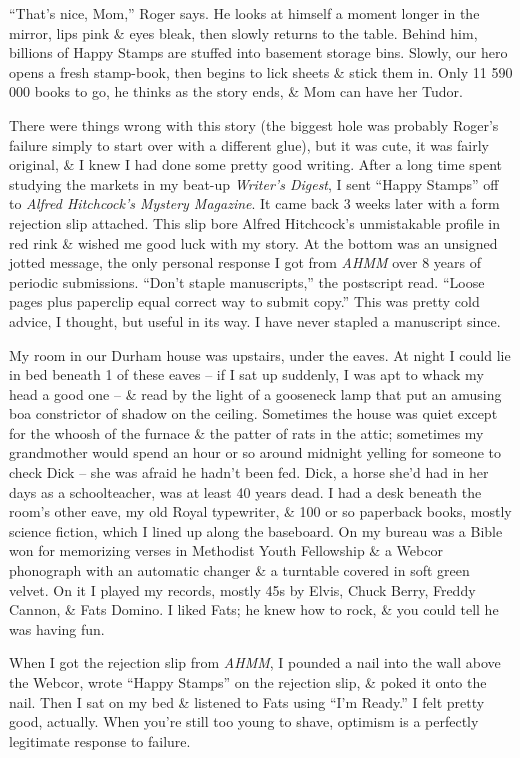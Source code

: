 \documentclass{article}
\numberwithin{equation}{section}
\begin{document}
``That's nice, Mom,'' Roger says. He looks at himself a moment longer in the mirror, lips pink \& eyes bleak, then slowly returns to the table. Behind him, billions of Happy Stamps are stuffed into basement storage bins. Slowly, our hero opens a fresh stamp-book, then begins to lick sheets \& stick them in. Only 11 590 000 books to go, he thinks as the story ends, \& Mom can have her Tudor.

There were things wrong with this story (the biggest hole was probably Roger's failure simply to start over with a different glue), but it was cute, it was fairly original, \& I knew I had done some pretty good writing. After a long time spent studying the markets in my beat-up \textit{Writer's Digest}, I sent ``Happy Stamps'' off to \textit{Alfred Hitchcock's Mystery Magazine}. It came back 3 weeks later with a form rejection slip attached. This slip bore Alfred Hitchcock's unmistakable profile in red rink \& wished me good luck with my story. At the bottom was an unsigned jotted message, the only personal response I got from \textit{AHMM} over 8 years of periodic submissions. ``Don't staple manuscripts,'' the postscript read. ``Loose pages plus paperclip equal correct way to submit copy.'' This was pretty cold advice, I thought, but useful in its way. I have never stapled a manuscript since.

 My room in our Durham house was upstairs, under the eaves. At night I could lie in bed beneath 1 of these eaves -- if I sat up suddenly, I was apt to whack my head a good one -- \& read by the light of a gooseneck lamp that put an amusing boa constrictor of shadow on the ceiling. Sometimes the house was quiet except for the whoosh of the furnace \& the patter of rats in the attic; sometimes my grandmother would spend an hour or so around midnight yelling for someone to check Dick -- she was afraid he hadn't been fed. Dick, a horse she'd had in her days as a schoolteacher, was at least 40 years dead. I had a desk beneath the room's other eave, my old Royal typewriter, \& 100 or so paperback books, mostly science fiction, which I lined up along the baseboard. On my bureau was a Bible won for memorizing verses in Methodist Youth Fellowship \& a Webcor phonograph with an automatic changer \& a turntable covered in soft green velvet. On it I played my records, mostly 45s by Elvis, Chuck Berry, Freddy Cannon, \& Fats Domino. I liked Fats; he knew how to rock, \& you could tell he was having fun.

When I got the rejection slip from \textit{AHMM}, I pounded a nail into the wall above the Webcor, wrote ``Happy Stamps'' on the rejection slip, \& poked it onto the nail. Then I sat on my bed \& listened to Fats using ``I'm Ready.'' I felt pretty good, actually. When you're still too young to shave, optimism is a perfectly legitimate response to failure.
\end{document}
